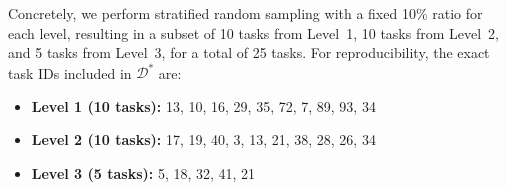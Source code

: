 Concretely, we perform stratified random sampling with a fixed 10\% ratio for each level, 
resulting in a subset of 10 tasks from Level~1, 10 tasks from Level~2, and 5 tasks from Level~3, 
for a total of 25 tasks. 
For reproducibility, the exact task IDs included in $\mathcal{D}^{*}$ are:  
\begin{itemize}
    \item \textbf{Level 1 (10 tasks):} 13, 10, 16, 29, 35, 72, 7, 89, 93, 34  
    \item \textbf{Level 2 (10 tasks):} 17, 19, 40, 3, 13, 21, 38, 28, 26, 34  
    \item \textbf{Level 3 (5 tasks):} 5, 18, 32, 41, 21
\end{itemize}

